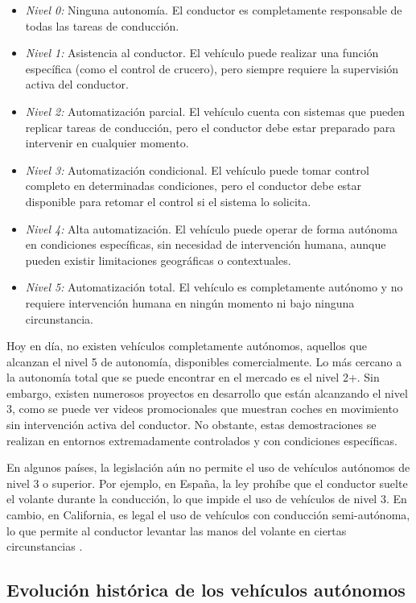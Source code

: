 \begin{itemize}
    \item \textit{Nivel 0:} Ninguna autonomía. El conductor es completamente responsable de todas las tareas de conducción.
    \item \textit{Nivel 1:} Asistencia al conductor. El vehículo puede realizar una función específica (como el control de crucero), pero siempre requiere la supervisión activa del conductor.
    \item \textit{Nivel 2:} Automatización parcial. El vehículo cuenta con sistemas que pueden replicar tareas de conducción, pero el conductor debe estar preparado para intervenir en cualquier momento.
    \item \textit{Nivel 3:} Automatización condicional. El vehículo puede tomar control completo en determinadas condiciones, pero el conductor debe estar disponible para retomar el control si el sistema lo solicita.
    \item \textit{Nivel 4:} Alta automatización. El vehículo puede operar de forma autónoma en condiciones específicas, sin necesidad de intervención humana, aunque pueden existir limitaciones geográficas o contextuales.
    \item \textit{Nivel 5:} Automatización total. El vehículo es completamente autónomo y no requiere intervención humana en ningún momento ni bajo ninguna circunstancia.
\end{itemize}

Hoy en día, no existen vehículos completamente autónomos, aquellos que alcanzan el nivel 5 de autonomía, disponibles comercialmente. Lo más cercano a la autonomía total que se puede encontrar en el mercado es el nivel 2+. Sin embargo, existen numerosos proyectos en desarrollo que están alcanzando el nivel 3, como se puede ver videos promocionales que muestran coches en movimiento sin intervención activa del conductor. No obstante, estas demostraciones se realizan en entornos extremadamente controlados y con condiciones específicas.

En algunos países, la legislación aún no permite el uso de vehículos autónomos de nivel 3 o superior. Por ejemplo, en España, la ley prohíbe que el conductor suelte el volante durante la conducción, lo que impide el uso de vehículos de nivel 3. En cambio, en California, es legal el uso de vehículos con conducción semi-autónoma, lo que permite al conductor levantar las manos del volante en ciertas circunstancias \cite{carwow-autonomous}. 

\subsection{Evolución histórica de los vehículos autónomos}
\label{sec:historia}


